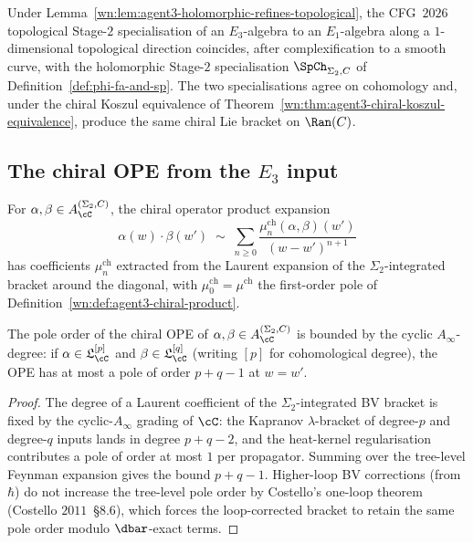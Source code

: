 \begin{corollary}
\label{wn:cor:agent3-cfg-matches-stage2}
\ClaimStatusProvedHere
Under Lemma~\ref{wn:lem:agent3-holomorphic-refines-topological}, the CFG~$2026$ topological Stage-$2$ specialisation of an $E_3$-algebra to an $E_1$-algebra along a $1$-dimensional topological direction coincides, after complexification to a smooth curve, with the holomorphic Stage-$2$ specialisation $\SpCh_{\Sigma_2,C}$ of Definition~\ref{def:phi-fa-and-sp}. The two specialisations agree on cohomology and, under the chiral Koszul equivalence of Theorem~\ref{wn:thm:agent3-chiral-koszul-equivalence}, produce the same chiral Lie bracket on $\Ran(C)$.
\end{corollary}

\subsection{The chiral OPE from the \texorpdfstring{$E_3$}{E-3} input}
\label{wn:subsec:agent3-chiral-ope}

\begin{definition}
\label{wn:def:agent3-chiral-ope}
For $\alpha,\beta\in A^{(\Sigma_2,C)}_\cC$, the chiral operator product expansion
\[
 \alpha(w)\cdot\beta(w')
 \;\sim\;
 \sum_{n\geq 0}
 \frac{\mu^{\mathrm{ch}}_n(\alpha,\beta)(w')}{(w-w')^{n+1}}
\]
has coefficients $\mu^{\mathrm{ch}}_n$ extracted from the Laurent expansion of the $\Sigma_2$-integrated bracket around the diagonal, with $\mu^{\mathrm{ch}}_0=\mu^{\mathrm{ch}}$ the first-order pole of Definition~\ref{wn:def:agent3-chiral-product}.
\end{definition}

\begin{proposition}
\label{wn:prop:agent3-pole-order-bound}
\ClaimStatusProvedHere
The pole order of the chiral OPE of $\alpha,\beta\in A^{(\Sigma_2,C)}_\cC$ is bounded by the cyclic $A_\infty$-degree: if $\alpha\in\mathfrak{L}_\cC^{[p]}$ and $\beta\in\mathfrak{L}_\cC^{[q]}$ (writing $[p]$ for cohomological degree), the OPE has at most a pole of order $p+q-1$ at $w=w'$.
\end{proposition}

\begin{proof}
The degree of a Laurent coefficient of the $\Sigma_2$-integrated BV bracket is fixed by the cyclic-$A_\infty$ grading of $\cC$: the Kapranov $\lambda$-bracket of degree-$p$ and degree-$q$ inputs lands in degree $p+q-2$, and the heat-kernel regularisation contributes a pole of order at most $1$ per propagator. Summing over the tree-level Feynman expansion gives the bound $p+q-1$. Higher-loop BV corrections (from $\hbar$) do not increase the tree-level pole order by Costello's one-loop theorem (Costello $2011$~\S$8.6$), which forces the loop-corrected bracket to retain the same pole order modulo $\dbar$-exact terms.
\end{proof}

